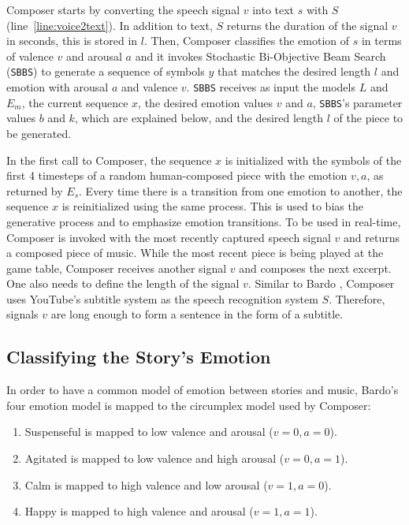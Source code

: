 Composer starts by converting the speech signal $v$ into text $s$ with $S$ (line~\ref{line:voice2text}). In addition to text, $S$ returns the duration of the signal $v$ in seconds, this is stored in $l$. Then, Composer classifies the emotion of $s$ in terms of valence $v$ and arousal $a$ and it
invokes Stochastic Bi-Objective Beam Search (\texttt{SBBS}) to generate a sequence of symbols $y$ that matches the desired length $l$ and emotion with arousal $a$ and valence $v$.
\texttt{SBBS} receives as input the models $L$ and $E_m$, the current sequence $x$, the desired emotion values $v$ and $a$, \texttt{SBBS}'s parameter values $b$ and $k$, which are explained below, and the desired length $l$ of the piece to be generated. %

In the first call to Composer, the sequence $x$ is initialized with the symbols of the first 4 timesteps of a random human-composed piece with the emotion $v, a$, as returned by $E_s$. Every time there is a transition from one emotion to another, the sequence $x$ is reinitialized using the same process. This is used to bias the generative process and to emphasize emotion transitions. To be used in real-time, Composer is invoked with the most recently captured speech signal $v$ and returns a composed piece of music. While the most recent piece is being played at the game table, Composer receives another signal $v$ and composes the next excerpt. One also needs to define the length of the signal $v$. Similar to Bardo \citet{padovani2017}, Composer uses YouTube's subtitle system as the speech recognition system $S$. Therefore, signals $v$ are long enough to form a sentence in the form of a subtitle.

\subsection{Classifying the Story's Emotion}

In order to have a common model of emotion between stories and music, Bardo's four emotion model is mapped to the circumplex model used by Composer:

\begin{enumerate}
    \item Suspenseful is mapped to low valence and arousal ($v = 0, a = 0$).
    \item Agitated is mapped to low valence and high arousal ($v = 0, a = 1$).
    \item Calm is mapped to high valence and low arousal ($v = 1, a = 0$).
    \item Happy is mapped to high valence and arousal ($v = 1, a = 1$).
\end{enumerate}

